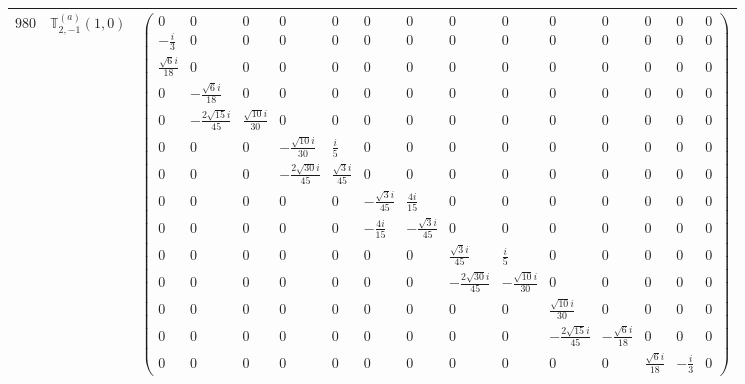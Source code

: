 \documentclass[fleqn,8pt,landscape]{jsarticle}
\begin{document}
\begin{center}
\begin{longtable}{ccc}
$ 980 $ & $ \mathbb{T}_{2,-1}^{(a)}(1,0) $ & $ \begin{pmatrix} 0 & 0 & 0 & 0 & 0 & 0 & 0 & 0 & 0 & 0 & 0 & 0 & 0 & 0 \\ - \frac{i}{3} & 0 & 0 & 0 & 0 & 0 & 0 & 0 & 0 & 0 & 0 & 0 & 0 & 0 \\ \frac{\sqrt{6} i}{18} & 0 & 0 & 0 & 0 & 0 & 0 & 0 & 0 & 0 & 0 & 0 & 0 & 0 \\ 0 & - \frac{\sqrt{6} i}{18} & 0 & 0 & 0 & 0 & 0 & 0 & 0 & 0 & 0 & 0 & 0 & 0 \\ 0 & - \frac{2 \sqrt{15} i}{45} & \frac{\sqrt{10} i}{30} & 0 & 0 & 0 & 0 & 0 & 0 & 0 & 0 & 0 & 0 & 0 \\ 0 & 0 & 0 & - \frac{\sqrt{10} i}{30} & \frac{i}{5} & 0 & 0 & 0 & 0 & 0 & 0 & 0 & 0 & 0 \\ 0 & 0 & 0 & - \frac{2 \sqrt{30} i}{45} & \frac{\sqrt{3} i}{45} & 0 & 0 & 0 & 0 & 0 & 0 & 0 & 0 & 0 \\ 0 & 0 & 0 & 0 & 0 & - \frac{\sqrt{3} i}{45} & \frac{4 i}{15} & 0 & 0 & 0 & 0 & 0 & 0 & 0 \\ 0 & 0 & 0 & 0 & 0 & - \frac{4 i}{15} & - \frac{\sqrt{3} i}{45} & 0 & 0 & 0 & 0 & 0 & 0 & 0 \\ 0 & 0 & 0 & 0 & 0 & 0 & 0 & \frac{\sqrt{3} i}{45} & \frac{i}{5} & 0 & 0 & 0 & 0 & 0 \\ 0 & 0 & 0 & 0 & 0 & 0 & 0 & - \frac{2 \sqrt{30} i}{45} & - \frac{\sqrt{10} i}{30} & 0 & 0 & 0 & 0 & 0 \\ 0 & 0 & 0 & 0 & 0 & 0 & 0 & 0 & 0 & \frac{\sqrt{10} i}{30} & 0 & 0 & 0 & 0 \\ 0 & 0 & 0 & 0 & 0 & 0 & 0 & 0 & 0 & - \frac{2 \sqrt{15} i}{45} & - \frac{\sqrt{6} i}{18} & 0 & 0 & 0 \\ 0 & 0 & 0 & 0 & 0 & 0 & 0 & 0 & 0 & 0 & 0 & \frac{\sqrt{6} i}{18} & - \frac{i}{3} & 0 \end{pmatrix} $ \\ \hline

\end{longtable}
\end{center}
\end{document}
